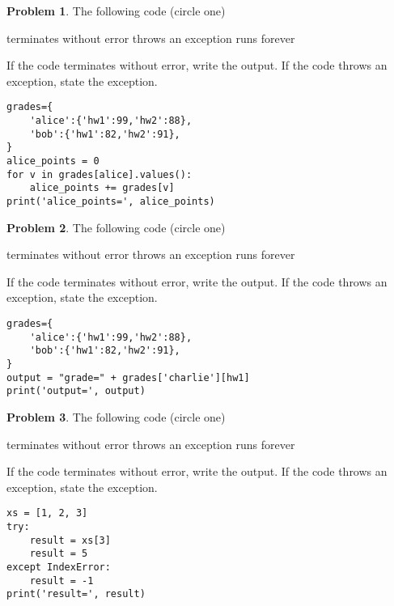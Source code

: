 \documentclass[10pt]{article}
\theoremstyle{definition}
\newtheorem{problem}{Problem}
\begin{document}
\begin{problem}
    The following code (circle one)

    \vspace{0.25in}
    \hspace{0.5in}terminates without error 
    \hspace{1in}throws an exception
    \hspace{1in}runs forever
    \vspace{0.25in}

    \noindent
    If the code terminates without error, write the output.
    If the code throws an exception, state the exception.
\end{problem}
\begin{lstlisting}
grades={
    'alice':{'hw1':99,'hw2':88},
    'bob':{'hw1':82,'hw2':91},
}
alice_points = 0
for v in grades[alice].values():
    alice_points += grades[v]
print('alice_points=', alice_points)
\end{lstlisting}
\vspace{0.75in}


\begin{problem}
    The following code (circle one)

    \vspace{0.25in}
    \hspace{0.5in}terminates without error 
    \hspace{1in}throws an exception
    \hspace{1in}runs forever
    \vspace{0.25in}

    \noindent
    If the code terminates without error, write the output.
    If the code throws an exception, state the exception.
\end{problem}
\begin{lstlisting}
grades={
    'alice':{'hw1':99,'hw2':88},
    'bob':{'hw1':82,'hw2':91},
}
output = "grade=" + grades['charlie'][hw1]
print('output=', output)
\end{lstlisting}
\vspace{0.75in}

\begin{problem}
    The following code (circle one)

    \vspace{0.25in}
    \hspace{0.5in}terminates without error 
    \hspace{1in}throws an exception
    \hspace{1in}runs forever
    \vspace{0.25in}

    \noindent
    If the code terminates without error, write the output.
    If the code throws an exception, state the exception.
\end{problem}
\begin{lstlisting}
xs = [1, 2, 3]
try:
    result = xs[3]
    result = 5
except IndexError:
    result = -1
print('result=', result)
\end{lstlisting}
\vspace{2in}
\end{document}
